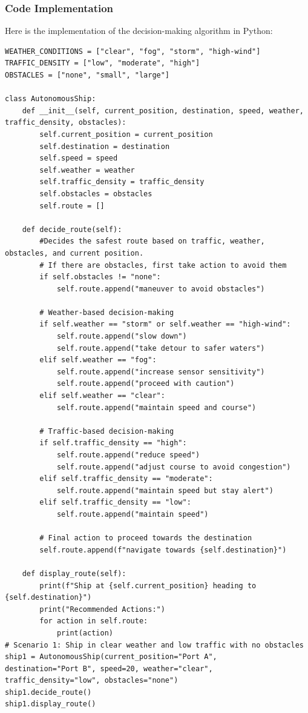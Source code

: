 \documentclass{article}
\begin{document}
\subsubsection{Code Implementation}

Here is the implementation of the decision-making algorithm in Python:

\begin{verbatim}
WEATHER_CONDITIONS = ["clear", "fog", "storm", "high-wind"]
TRAFFIC_DENSITY = ["low", "moderate", "high"]
OBSTACLES = ["none", "small", "large"]  

class AutonomousShip:
    def __init__(self, current_position, destination, speed, weather, traffic_density, obstacles):
        self.current_position = current_position
        self.destination = destination
        self.speed = speed
        self.weather = weather
        self.traffic_density = traffic_density
        self.obstacles = obstacles
        self.route = []

    def decide_route(self):
        #Decides the safest route based on traffic, weather, obstacles, and current position.
        # If there are obstacles, first take action to avoid them
        if self.obstacles != "none":
            self.route.append("maneuver to avoid obstacles")

        # Weather-based decision-making
        if self.weather == "storm" or self.weather == "high-wind":
            self.route.append("slow down")
            self.route.append("take detour to safer waters")
        elif self.weather == "fog":
            self.route.append("increase sensor sensitivity")
            self.route.append("proceed with caution")
        elif self.weather == "clear":
            self.route.append("maintain speed and course")

        # Traffic-based decision-making
        if self.traffic_density == "high":
            self.route.append("reduce speed")
            self.route.append("adjust course to avoid congestion")
        elif self.traffic_density == "moderate":
            self.route.append("maintain speed but stay alert")
        elif self.traffic_density == "low":
            self.route.append("maintain speed")

        # Final action to proceed towards the destination
        self.route.append(f"navigate towards {self.destination}")

    def display_route(self):
        print(f"Ship at {self.current_position} heading to {self.destination}")
        print("Recommended Actions:")
        for action in self.route:
            print(action)
# Scenario 1: Ship in clear weather and low traffic with no obstacles
ship1 = AutonomousShip(current_position="Port A",
destination="Port B", speed=20, weather="clear", traffic_density="low", obstacles="none")
ship1.decide_route()
ship1.display_route()


\end{verbatim}
\end{document}
